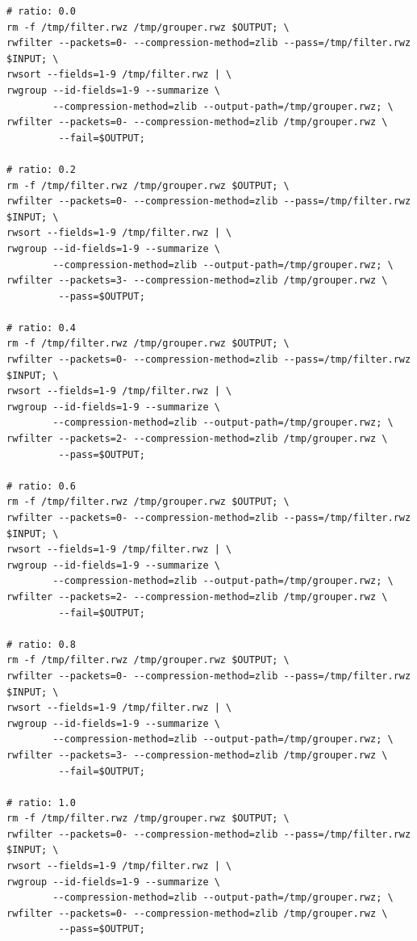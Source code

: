 \begin{lstlisting}
# ratio: 0.0
rm -f /tmp/filter.rwz /tmp/grouper.rwz $OUTPUT; \
rwfilter --packets=0- --compression-method=zlib --pass=/tmp/filter.rwz $INPUT; \
rwsort --fields=1-9 /tmp/filter.rwz | \
rwgroup --id-fields=1-9 --summarize \
        --compression-method=zlib --output-path=/tmp/grouper.rwz; \
rwfilter --packets=0- --compression-method=zlib /tmp/grouper.rwz \
         --fail=$OUTPUT;

# ratio: 0.2
rm -f /tmp/filter.rwz /tmp/grouper.rwz $OUTPUT; \
rwfilter --packets=0- --compression-method=zlib --pass=/tmp/filter.rwz $INPUT; \
rwsort --fields=1-9 /tmp/filter.rwz | \
rwgroup --id-fields=1-9 --summarize \
        --compression-method=zlib --output-path=/tmp/grouper.rwz; \
rwfilter --packets=3- --compression-method=zlib /tmp/grouper.rwz \
         --pass=$OUTPUT;

# ratio: 0.4
rm -f /tmp/filter.rwz /tmp/grouper.rwz $OUTPUT; \
rwfilter --packets=0- --compression-method=zlib --pass=/tmp/filter.rwz $INPUT; \
rwsort --fields=1-9 /tmp/filter.rwz | \
rwgroup --id-fields=1-9 --summarize \
        --compression-method=zlib --output-path=/tmp/grouper.rwz; \
rwfilter --packets=2- --compression-method=zlib /tmp/grouper.rwz \
         --pass=$OUTPUT;

# ratio: 0.6
rm -f /tmp/filter.rwz /tmp/grouper.rwz $OUTPUT; \
rwfilter --packets=0- --compression-method=zlib --pass=/tmp/filter.rwz $INPUT; \
rwsort --fields=1-9 /tmp/filter.rwz | \
rwgroup --id-fields=1-9 --summarize \
        --compression-method=zlib --output-path=/tmp/grouper.rwz; \
rwfilter --packets=2- --compression-method=zlib /tmp/grouper.rwz \
         --fail=$OUTPUT;

# ratio: 0.8
rm -f /tmp/filter.rwz /tmp/grouper.rwz $OUTPUT; \
rwfilter --packets=0- --compression-method=zlib --pass=/tmp/filter.rwz $INPUT; \
rwsort --fields=1-9 /tmp/filter.rwz | \
rwgroup --id-fields=1-9 --summarize \
        --compression-method=zlib --output-path=/tmp/grouper.rwz; \
rwfilter --packets=3- --compression-method=zlib /tmp/grouper.rwz \
         --fail=$OUTPUT;

# ratio: 1.0
rm -f /tmp/filter.rwz /tmp/grouper.rwz $OUTPUT; \
rwfilter --packets=0- --compression-method=zlib --pass=/tmp/filter.rwz $INPUT; \
rwsort --fields=1-9 /tmp/filter.rwz | \
rwgroup --id-fields=1-9 --summarize \
        --compression-method=zlib --output-path=/tmp/grouper.rwz; \
rwfilter --packets=0- --compression-method=zlib /tmp/grouper.rwz \
         --pass=$OUTPUT;
\end{lstlisting}



